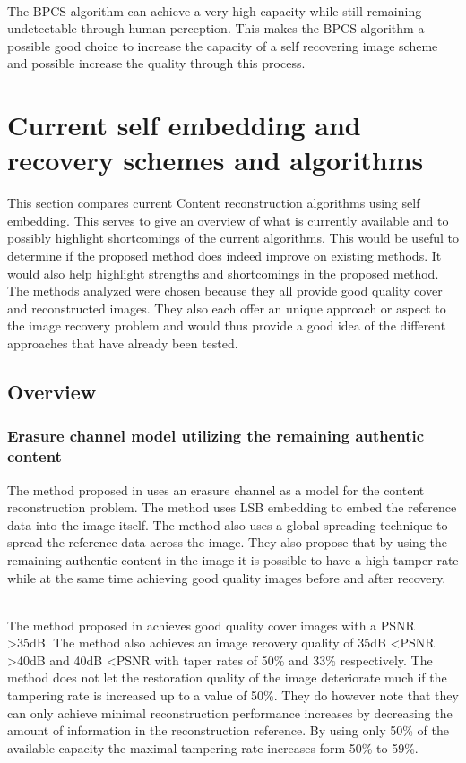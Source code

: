 \documentclass[12pt]{article}
\begin{document}
\hspace{0pt} \\
The BPCS algorithm can achieve a very high capacity while still remaining undetectable through human perception.
This makes the BPCS algorithm a possible good choice to increase the capacity of a self recovering image scheme and possible increase the quality through this process.


\section{Current self embedding and recovery schemes and algorithms}

This section compares current Content reconstruction algorithms using self embedding.
This serves to give an overview of what is currently available and to possibly highlight shortcomings of the current algorithms.
This would be useful to determine if the proposed method does indeed improve on existing methods. 
It would also help highlight strengths and shortcomings in the proposed method.
The methods analyzed were chosen because they all provide good quality cover and reconstructed images.
They also each offer an unique approach or aspect to the image recovery problem and would thus provide a good idea of the different approaches that have already been tested.

\subsection{Overview}

\subsubsection{Erasure channel model utilizing the remaining authentic content}
\label{ErasureChannelOverview}
The method proposed in \cite {korus2013efficient} uses an erasure channel as a model for the content reconstruction problem.
The method uses LSB embedding to embed the reference data into the image itself.
The method also uses a global spreading technique to spread the reference data across the image.
They also propose that by using the remaining authentic content in the image it is possible to have a high tamper rate while at the same time achieving good quality images before and after recovery.

\hspace{0pt} \\
The method proposed in \cite {korus2013efficient} achieves good quality cover images with a PSNR \textgreater 35dB. 
The method also achieves an image recovery quality of 35dB \textless PSNR \textgreater 40dB and 40dB \textless PSNR with taper rates of 50\% and 33\% respectively.
The method does not let the restoration quality of the image deteriorate much if the tampering rate is increased up to a value of 50\%.
They do however note that they can only achieve minimal reconstruction performance increases by decreasing the amount of information in the reconstruction reference.
By using only 50\% of the available capacity the maximal tampering rate increases form 50\% to 59\%.
\end{document}
